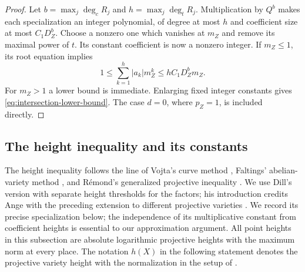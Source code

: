 \begin{proof}
Let $b=\max_j\deg_c R_j$ and $h=\max_j\deg_t R_j$.
Multiplication by $Q^b$ makes each specialization an integer polynomial,
of degree at most $h$ and coefficient size at most $C_1D_Z^b$.
Choose a nonzero one which vanishes at $m_Z$ and remove its maximal
power of $t$.  Its constant coefficient is now a nonzero integer.  If
$m_Z\le1$, its root equation implies
\[
 1\le \sum_{k=1}^h |a_k|m_Z^k
     \le hC_1D_Z^b m_Z.
\]
For $m_Z>1$ a lower bound is immediate.  Enlarging fixed integer
constants gives \eqref{eq:intersection-lower-bound}.  The case $d=0$,
where $p_Z=1$, is included directly.
\end{proof}

\subsection{The height inequality and its constants}

The height inequality follows the line of Vojta's curve method
\cite{Vojta1991}, Faltings' abelian-variety method \cite{Faltings1991},
and R\'emond's generalized projective inequality
\cite{Remond2005Vojta}. We use Dill's version with separate height
thresholds for the factors; his introduction credits Ange with the
preceding extension to different projective varieties
\cite[Introduction]{Dill2020}. We record its precise specialization
below; the independence of its multiplicative constant from coefficient
heights is essential to our approximation argument.  All point heights in this subsection are
absolute logarithmic projective heights with the maximum norm at every
place.  The notation $h(X)$ in the following statement denotes the
projective variety height with the normalization in the setup of
\cite[Theorem~1.1]{Dill2020}.


